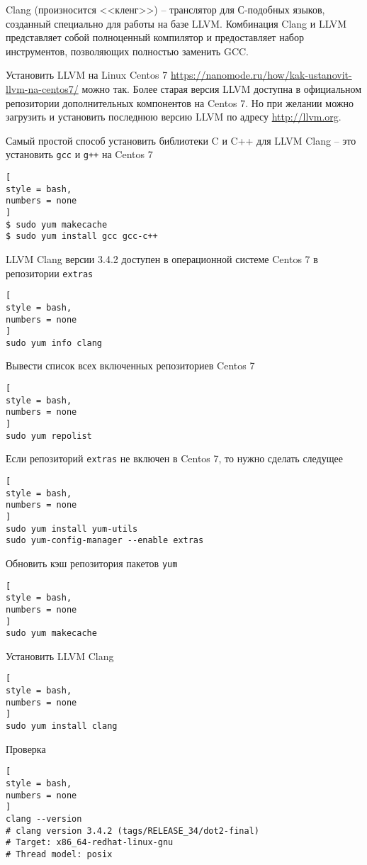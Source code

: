 \documentclass[%
	11pt,
	a4paper,
	utf8,
		]{article}
\begin{document}
Clang (произносится <<кленг>>) -- транслятор для С-подобных языков, созданный специально для работы на базе LLVM. Комбинация Clang и LLVM представляет собой полноценный компилятор и предоставляет набор инструментов, позволяющих полностью заменить GCC.

Установить LLVM на Linux Centos 7 \url{https://nanomode.ru/how/kak-ustanovit-llvm-na-centos7/} можно так. Более старая версия LLVM доступна в официальном репозитории дополнительных компонентов на Centos 7. Но при желании можно загрузить и установить последнюю версию LLVM по адресу \url{http://llvm.org}.

Самый простой способ установить библиотеки C и C++ для LLVM Clang -- это установить \verb|gcc| и \verb|g++| на Centos 7
\begin{lstlisting}[
style = bash,
numbers = none
]
$ sudo yum makecache
$ sudo yum install gcc gcc-c++
\end{lstlisting}

LLVM Clang версии 3.4.2 доступен в операционной системе Centos 7 в репозитории \verb|extras|
\begin{lstlisting}[
style = bash,
numbers = none
]
sudo yum info clang
\end{lstlisting}

Вывести список всех включенных репозиториев Centos 7
\begin{lstlisting}[
style = bash,
numbers = none
]
sudo yum repolist
\end{lstlisting}

Если репозиторий \verb|extras| не включен в Centos 7, то нужно сделать следущее
\begin{lstlisting}[
style = bash,
numbers = none	
]
sudo yum install yum-utils
sudo yum-config-manager --enable extras
\end{lstlisting}

Обновить кэш репозитория пакетов \verb|yum| 
\begin{lstlisting}[
style = bash,
numbers = none
]
sudo yum makecache
\end{lstlisting}

Установить LLVM Clang
\begin{lstlisting}[
style = bash,
numbers = none
]
sudo yum install clang
\end{lstlisting}

Проверка
\begin{lstlisting}[
style = bash,
numbers = none
]
clang --version
# clang version 3.4.2 (tags/RELEASE_34/dot2-final)
# Target: x86_64-redhat-linux-gnu
# Thread model: posix
\end{lstlisting}
\end{document}
